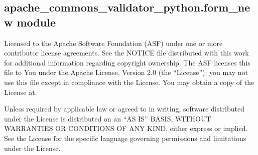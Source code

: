 \documentclass[letterpaper,10pt,english]{sphinxmanual}
\begin{document}
\subsection{apache\_commons\_validator\_python.form\_new module}
\label{\detokenize{apache_commons_validator_python:module-apache_commons_validator_python.form_new}}\label{\detokenize{apache_commons_validator_python:apache-commons-validator-python-form-new-module}}
\sphinxAtStartPar
Licensed to the Apache Software Foundation (ASF) under one or more contributor
license agreements.  See the NOTICE file distributed with this work for additional
information regarding copyright ownership. The ASF licenses this file to You under the
Apache License, Version 2.0 (the “License”); you may not use this file except in
compliance with the License.  You may obtain a copy of the License at.

\sphinxAtStartPar
{}

\sphinxAtStartPar
Unless required by applicable law or agreed to in writing, software
distributed under the License is distributed on an “AS IS” BASIS,
WITHOUT WARRANTIES OR CONDITIONS OF ANY KIND, either express or implied.
See the License for the specific language governing permissions and
limitations under the License.
\end{document}
